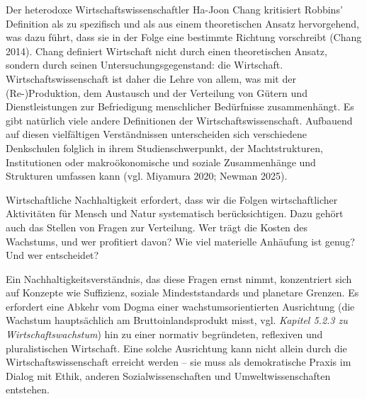 \documentclass[
  nswissgerman,
  a4paper,
  openany]{book}
\begin{document}
Der heterodoxe Wirtschaftswissenschaftler Ha-Joon Chang kritisiert
Robbins' Definition als zu spezifisch und als aus einem theoretischen
Ansatz hervorgehend, was dazu führt, dass sie in der Folge eine
bestimmte Richtung vorschreibt (Chang 2014). Chang definiert Wirtschaft
nicht durch einen theoretischen Ansatz, sondern durch seinen
Untersuchungsgegenstand: die Wirtschaft. Wirtschaftswissenschaft ist
daher die Lehre von allem, was mit der (Re-)Produktion, dem Austausch
und der Verteilung von Gütern und Dienstleistungen zur Befriedigung
menschlicher Bedürfnisse zusammenhängt. Es gibt natürlich viele andere
Definitionen der Wirtschaftswissenschaft. Aufbauend auf diesen
vielfältigen Verständnissen unterscheiden sich verschiedene Denkschulen
folglich in ihrem Studienschwerpunkt, der Machtstrukturen, Institutionen
oder makroökonomische und soziale Zusammenhänge und Strukturen umfassen
kann (vgl. Miyamura 2020; Newman 2025).

Wirtschaftliche Nachhaltigkeit erfordert, dass wir die Folgen
wirtschaftlicher Aktivitäten für Mensch und Natur systematisch
berücksichtigen. Dazu gehört auch das Stellen von Fragen zur Verteilung.
Wer trägt die Kosten des Wachstums, und wer profitiert davon? Wie viel
materielle Anhäufung ist genug? Und wer entscheidet?

Ein Nachhaltigkeitsverständnis, das diese Fragen ernst nimmt,
konzentriert sich auf Konzepte wie Suffizienz, soziale Mindeststandards
und planetare Grenzen. Es erfordert eine Abkehr vom Dogma einer
wachstumsorientierten Ausrichtung (die Wachstum hauptsächlich am
Bruttoinlandsprodukt misst, vgl. \emph{Kapitel 5.2.3 zu
Wirtschaftswachstum}) hin zu einer normativ begründeten, reflexiven und
pluralistischen Wirtschaft. Eine solche Ausrichtung kann nicht allein
durch die Wirtschaftswissenschaft erreicht werden -- sie muss als
demokratische Praxis im Dialog mit Ethik, anderen Sozialwissenschaften
und Umweltwissenschaften entstehen.
\end{document}
